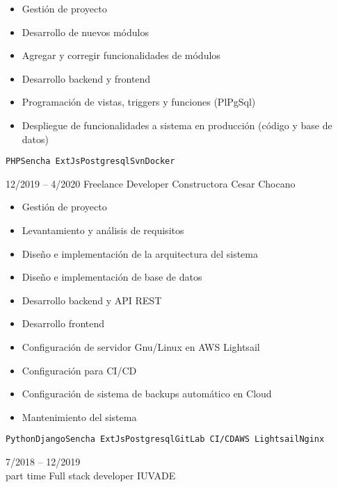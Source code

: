 \begin{entrylist}
{\begin{itemize}
    	        \item Gestión de proyecto
    	        \item Desarrollo de nuevos módulos
    	        \item Agregar y corregir funcionalidades de módulos
    	        \item Desarrollo backend y frontend
    	        \item Programación de vistas, triggers y funciones (PlPgSql)
    	        \item Despliegue de funcionalidades a sistema en producción (código y base de datos)
    	    \end{itemize}
		    \texttt{PHP}\slashsep\texttt{Sencha ExtJs}\slashsep\texttt{Postgresql}\slashsep\texttt{Svn}\slashsep\texttt{Docker}
        }
    \entry
		{12/2019 -- 4/2020}
		{Freelance Developer}
		{Constructora Cesar Chocano}
		{
		    \vspace{-5mm}
    	    \begin{itemize}
    	        \setlength\itemsep{0pt}
    	        \setlength\parskip{0pt}
    	        \item Gestión de proyecto
    	        \item Levantamiento y análisis de requisitos
    	        \item Diseño e implementación de la arquitectura del sistema
    	        \item Diseño e implementación de base de datos
    	        \item Desarrollo backend y API REST
    	        \item Desarrollo frontend
    	        \item Configuración de servidor Gnu/Linux en AWS Lightsail
    	        \item Configuración para CI/CD
    	        \item Configuración de sistema de backups automático en Cloud
    	        \item Mantenimiento del sistema
    	    \end{itemize}
		    \texttt{Python}\slashsep\texttt{Django}\slashsep\texttt{Sencha ExtJs}\slashsep\texttt{Postgresql}\slashsep\texttt{GitLab CI/CD}\slashsep\texttt{AWS Lightsail}\slashsep\texttt{Nginx}
        }
	\entry
		{7/2018 -- 12/2019\\\footnotesize{part time}}
		{Full stack developer}
		{IUVADE}
		{
		    \vspace{-5mm}
    	    \begin{itemize}
    	        \setlength\itemsep{0pt}

\end{itemize}}
\end{entrylist}
